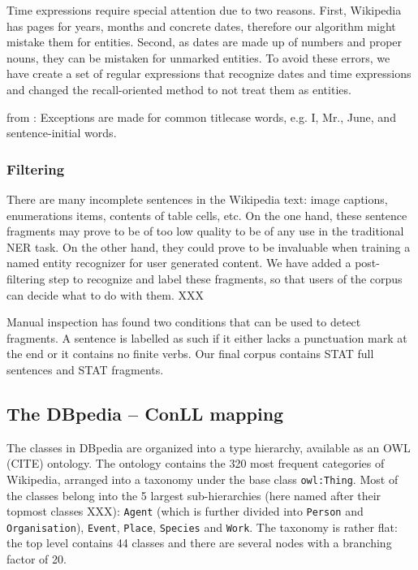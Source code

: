 \documentclass[11pt]{article}
\begin{document}
Time expressions require special attention due to two reasons. First, Wikipedia has pages for years, months and concrete dates, therefore our algorithm might mistake them for entities. Second, as dates are made up of numbers and proper nouns, they can be mistaken for unmarked entities. To avoid these errors, we have create a set of regular expressions that recognize dates and time expressions and changed the recall-oriented method to not treat them as entities.

from \cite{Nothman:09}: Exceptions are made for common titlecase words, e.g. I, Mr., June, and sentence-initial words. 


\subsubsection{Filtering}

There are many incomplete sentences in the Wikipedia text: image captions, enumerations items, contents of table cells, etc. On the one hand, these sentence fragments may prove to be of too low quality to be of any use in the traditional NER task. On the other hand, they could prove to be invaluable when training a named entity recognizer for user generated content. We have added a post-filtering step to recognize and label these fragments, so that users of the corpus can decide what to do with them. XXX

Manual inspection has found two conditions that can be used to detect fragments. A sentence is labelled as such if it either lacks a punctuation mark at the end or it contains no finite verbs. Our final corpus contains STAT full sentences and STAT fragments.


\subsection{The DBpedia -- ConLL mapping}


The classes in DBpedia are organized into a type hierarchy, available as an OWL (CITE) ontology. The ontology contains the 320 most frequent categories of Wikipedia, arranged into a taxonomy under the base class \texttt{owl:Thing}. Most of the classes belong into the 5 largest sub-hierarchies (here named after their topmost classes XXX): \texttt{Agent} (which is further divided into \texttt{Person} and \texttt{Organisation}), \texttt{Event}, \texttt{Place}, \texttt{Species} and \texttt{Work}. The taxonomy is rather flat: the top level contains 44 classes and there are several nodes with a branching factor of 20.
\end{document}
